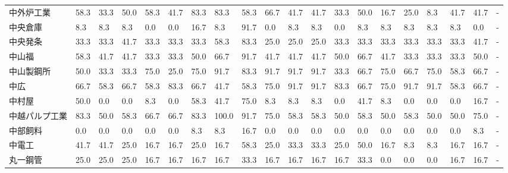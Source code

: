 \begin{tabular}{llllllllllllllllllll}
中外炉工業           &   58.3 &   33.3 &      50.0 &      58.3 &       41.7 &   83.3 &   83.3 &   58.3 &    66.7 &    41.7 &   41.7 &  33.3 &   50.0 &    16.7 &    25.0 &   8.3 &  41.7 &  41.7 &     - \\
中央倉庫            &    8.3 &    8.3 &       8.3 &       0.0 &        0.0 &   16.7 &    8.3 &   91.7 &     0.0 &     8.3 &    8.3 &   0.0 &    8.3 &     8.3 &     8.3 &   8.3 &   8.3 &   0.0 &     - \\
中央発条            &   33.3 &   33.3 &      41.7 &      33.3 &       33.3 &   33.3 &   58.3 &   83.3 &    25.0 &    25.0 &   25.0 &  33.3 &   33.3 &    33.3 &    33.3 &  33.3 &  33.3 &  41.7 &     - \\
中山福             &   58.3 &   41.7 &      41.7 &      33.3 &       33.3 &   50.0 &   66.7 &   91.7 &    41.7 &    41.7 &   41.7 &  50.0 &   66.7 &    41.7 &    33.3 &  33.3 &  33.3 &  50.0 &     - \\
中山製鋼所           &   50.0 &   33.3 &      33.3 &      75.0 &       25.0 &   75.0 &   91.7 &   83.3 &    91.7 &    91.7 &   91.7 &  33.3 &   66.7 &    75.0 &    66.7 &  75.0 &  58.3 &  66.7 &     - \\
中広              &   66.7 &   58.3 &      66.7 &      58.3 &       83.3 &   66.7 &   41.7 &   58.3 &    75.0 &    91.7 &   91.7 &  83.3 &   66.7 &    75.0 &    91.7 &  91.7 &  58.3 &  66.7 &     - \\
中村屋             &   50.0 &    0.0 &       0.0 &       8.3 &        0.0 &   58.3 &   41.7 &   75.0 &     8.3 &     8.3 &    8.3 &   0.0 &   41.7 &     8.3 &     0.0 &   0.0 &   0.0 &  16.7 &     - \\
中越パルプ工業         &   83.3 &   50.0 &      58.3 &      66.7 &       66.7 &   83.3 &  100.0 &   91.7 &    75.0 &    58.3 &   58.3 &  50.0 &   58.3 &    50.0 &    58.3 &  50.0 &  50.0 &  75.0 &     - \\
中部飼料            &    0.0 &    0.0 &       0.0 &       0.0 &        0.0 &    8.3 &    8.3 &   16.7 &     0.0 &     0.0 &    0.0 &   0.0 &    0.0 &     0.0 &     0.0 &   0.0 &   0.0 &   8.3 &     - \\
中電工             &   41.7 &   41.7 &      25.0 &      16.7 &       16.7 &   25.0 &   16.7 &   58.3 &    25.0 &    33.3 &   33.3 &  25.0 &   50.0 &    16.7 &     8.3 &   8.3 &  16.7 &  16.7 &     - \\
丸一鋼管            &   25.0 &   25.0 &      25.0 &      16.7 &       16.7 &   16.7 &   16.7 &   33.3 &    16.7 &    16.7 &   16.7 &  16.7 &   33.3 &     0.0 &     0.0 &   0.0 &  16.7 &  16.7 &     - \\

\end{tabular}
